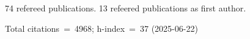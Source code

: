 74 refereed publications. 13 refeered publications as first author.

Total citations~=~4968; h-index~=~37 (2025-06-22)
